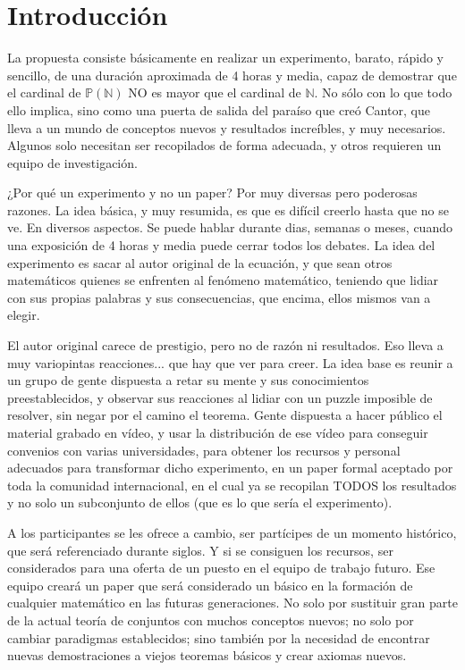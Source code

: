 \chapter{Introducción}

\noindent
La propuesta consiste básicamente en realizar un experimento, barato, rápido y sencillo, de una duración aproximada de 4 horas y media, capaz de demostrar que el cardinal de $\mathbb{P(N)}$ NO es mayor que el cardinal de $\mathbb{N}$. No sólo con lo que todo ello implica, sino como una puerta de salida del paraíso que creó Cantor, que lleva a un mundo de conceptos nuevos y resultados increíbles, y muy necesarios. Algunos solo necesitan ser recopilados de forma adecuada, y otros requieren un equipo de investigación.

\noindent
¿Por qué un experimento y no un paper? Por muy diversas pero poderosas razones. La idea básica, y muy resumida, es que es difícil creerlo hasta que no se ve. En diversos aspectos. Se puede hablar durante dias, semanas o meses, cuando una exposición de 4 horas y media puede cerrar todos los debates. La idea del experimento es sacar al autor original de la ecuación, y que sean otros matemáticos quienes se enfrenten al fenómeno matemático, teniendo que lidiar con sus propias palabras y sus consecuencias, que encima, ellos mismos van a elegir.

\noindent
El autor original carece de prestigio, pero no de razón ni resultados. Eso lleva a muy variopintas reacciones... que hay que ver para creer. La idea base es reunir a un grupo de gente dispuesta a retar su mente y sus conocimientos preestablecidos, y observar sus reacciones al lidiar con un puzzle imposible de resolver, sin negar por el camino el teorema. Gente dispuesta a hacer público el material grabado en vídeo, y usar la distribución de ese vídeo para conseguir convenios con varias universidades, para obtener los recursos y personal adecuados para transformar dicho experimento, en un paper formal aceptado por toda la comunidad internacional, en el cual ya se recopilan TODOS los resultados y no solo un subconjunto de ellos (que es lo que sería el experimento).

\noindent
A los participantes se les ofrece a cambio, ser partícipes de un momento histórico, que será referenciado durante siglos. Y si se consiguen los recursos, ser considerados para una oferta de un puesto en el equipo de trabajo futuro. Ese equipo creará un paper que será considerado un básico en la formación de cualquier matemático en las futuras generaciones. No solo por sustituir gran parte de la actual teoría de conjuntos con muchos conceptos nuevos; no solo por cambiar paradigmas establecidos; sino también por la necesidad de encontrar nuevas demostraciones a viejos teoremas básicos y crear axiomas nuevos.

